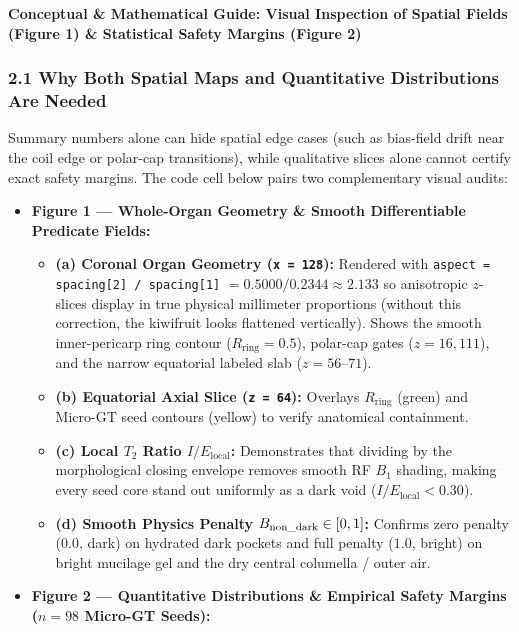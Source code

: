 \documentclass[10pt,a4paper]{article}
\renewcommand{\_}{\origunderscore\allowbreak}
\begin{document}
\begin{guidehdr}
{\small\bfseries\color{kiwigreen!75!black}Conceptual \& Mathematical Guide: Visual Inspection of Spatial Fields (Figure 1) \& Statistical Safety Margins (Figure 2)}
\end{guidehdr}

\subsubsection*{2.1 Why Both Spatial Maps and Quantitative Distributions Are Needed}
Summary numbers alone can hide spatial edge cases (such as bias-field drift near the coil edge or polar-cap transitions), while qualitative slices alone cannot certify exact safety margins. The code cell below pairs two complementary visual audits:

\begin{itemize}
\item \textbf{Figure 1 --- Whole-Organ Geometry \& Smooth Differentiable Predicate Fields:}
\begin{itemize}
\item \textbf{(a) Coronal Organ Geometry (\texttt{x = 128}):} Rendered with \texttt{aspect = spacing[2] /\allowbreak{} spacing[1]} $= 0.5000 / 0.2344 \approx 2.133$ so anisotropic $z$-slices display in true physical millimeter proportions (without this correction, the kiwifruit looks flattened vertically). Shows the smooth inner-pericarp ring contour ($R_{\text{ring}} = 0.5$), polar-cap gates ($z = 16, 111$), and the narrow equatorial labeled slab ($z = 56$--$71$).
\item \textbf{(b) Equatorial Axial Slice (\texttt{z = 64}):} Overlays $R_{\text{ring}}$ (green) and Micro-GT seed contours (yellow) to verify anatomical containment.
\item \textbf{(c) Local $T_2$ Ratio $I / E_{\text{local}}$:} Demonstrates that dividing by the morphological closing envelope removes smooth RF $B_1$ shading, making every seed core stand out uniformly as a dark void ($I / E_{\text{local}} < 0.30$).
\item \textbf{(d) Smooth Physics Penalty $B_{\text{non\_dark}} \in [0, 1]$:} Confirms zero penalty ($0.0$, dark) on hydrated dark pockets and full penalty ($1.0$, bright) on bright mucilage gel and the dry central columella /\allowbreak{} outer air.
\end{itemize}
\item \textbf{Figure 2 --- Quantitative Distributions \& Empirical Safety Margins ($n = 98$ Micro-GT Seeds):}
\begin{itemize}

\end{itemize}
\end{itemize}
\end{document}
